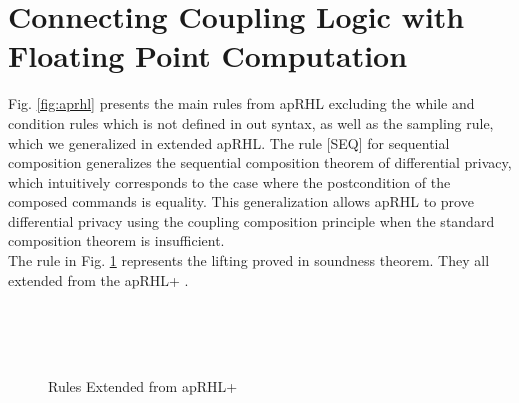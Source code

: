 \documentclass[a4paper,11pt]{article}
\begin{document}
\section{
Connecting Coupling Logic
%
with Floating Point Computation
}
%
Fig. \ref{fig:aprhl} presents the main rules from apRHL excluding the while and condition rules which is not defined in out syntax, as well as the sampling rule, which we generalized in extended apRHL.
The rule [SEQ] for sequential composition generalizes the sequential composition theorem of differential privacy, which intuitively corresponds to the case where the postcondition of the composed commands is equality.
This generalization allows apRHL to prove differential privacy using the coupling composition principle when the standard composition theorem is insufficient.
\\
The rule in Fig. \ref{fig:aprhlplus} represents the lifting proved in soundness theorem. They all extended from the apRHL+ \cite{barthe2016proving}.
\begin{figure}[t]
\\
\\
\\
\caption{Rules Extended from apRHL+}
\label{fig:aprhlplus}
\end{figure}
\end{document}
